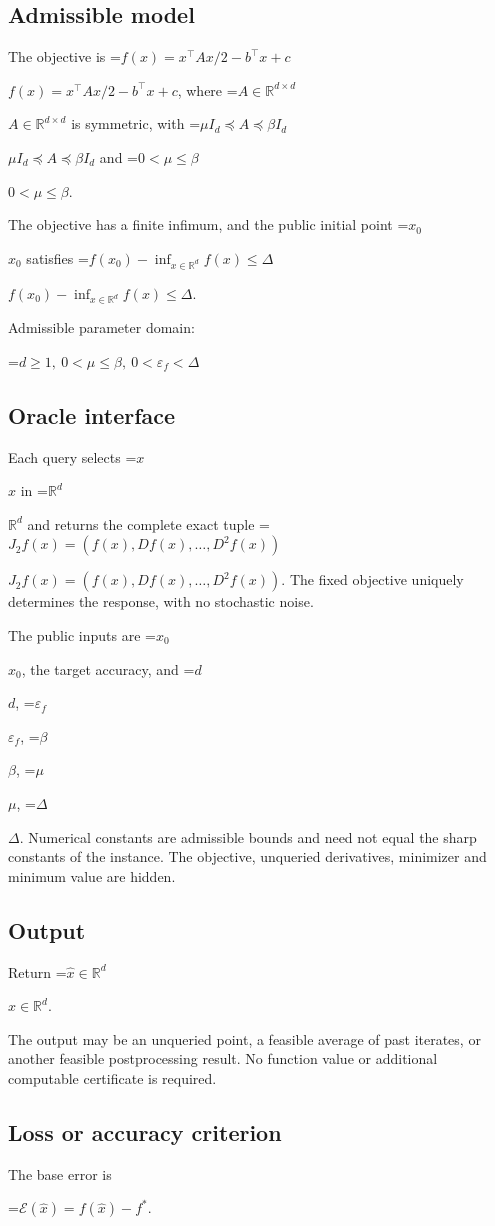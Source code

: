 \documentclass[10pt,a4paper]{article}
\newcommand{\AtlasMath}[1]{\par\begingroup\centering\setbox0=\hbox{$\displaystyle #1$}\ifdim\wd0>1.4\linewidth\typeout{ATLAS WIDE FORMULA: \the\wd0}\fi\ifdim\wd0>\linewidth\resizebox{\linewidth}{!}{\box0}\else\box0\fi\par\endgroup}
\newcommand{\AtlasInlineMath}[1]{\begingroup\setbox0=\hbox{$#1$}\ifdim\wd0>.4\linewidth\endgroup\AtlasMath{#1}\else\endgroup$#1$\fi}
\begin{document}
\subsection{Admissible model}
The objective is \AtlasInlineMath{f(x)=x^\top A x/2-b^\top x+c}, where \AtlasInlineMath{A\in\mathbb{R}^{d\times d}} is symmetric, with \AtlasInlineMath{\mu I_d\preceq A\preceq\beta I_d} and \AtlasInlineMath{0<\mu\le\beta}.

The objective has a finite infimum, and the public initial point \AtlasInlineMath{x_0} satisfies \AtlasInlineMath{f(x_0)-\inf_{x\in \mathbb{R}^d}f(x)\le\Delta}.

Admissible parameter domain:


\AtlasMath{d\ge1,\ 0<\mu\le\beta,\ 0<\varepsilon_f<\Delta}


\subsection{Oracle interface}
Each query selects \AtlasInlineMath{x} in \AtlasInlineMath{\mathbb{R}^d} and returns the complete exact tuple \AtlasInlineMath{J_{2}f(x)=(f(x),Df(x),\ldots,D^{2}f(x))}. The fixed objective uniquely determines the response, with no stochastic noise.

The public inputs are \AtlasInlineMath{x_0}, the target accuracy, and \AtlasInlineMath{d}, \AtlasInlineMath{\varepsilon_f}, \AtlasInlineMath{\beta}, \AtlasInlineMath{\mu}, \AtlasInlineMath{\Delta}. Numerical constants are admissible bounds and need not equal the sharp constants of the instance. The objective, unqueried derivatives, minimizer and minimum value are hidden.

\subsection{Output}
Return \AtlasInlineMath{\widehat{x}\in \mathbb{R}^d}.

The output may be an unqueried point, a feasible average of past iterates, or another feasible postprocessing result. No function value or additional computable certificate is required.

\subsection{Loss or accuracy criterion}
The base error is


\AtlasMath{\mathcal{E}(\widehat{x})=f(\widehat{x})-f^*.}
\end{document}
